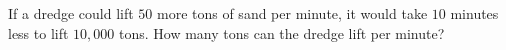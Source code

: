 If a dredge could lift $50$ more tons of sand per minute, it would take $10$ minutes less to lift $10{,}000$ tons. How many tons can the dredge lift per minute?
